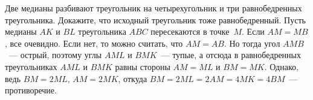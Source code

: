 \problem{}
Две медианы разбивают треугольник на четырехугольник и три равнобедренных
треугольника.
Докажите, что исходный треугольник тоже равнобедренный.
\solution
Пусть медианы $AK$ и $BL$ треугольника $ABC$ пересекаются в точке~$M$.
Если $AM = MB$, все очевидно.
Если нет, то можно считать, что $AM = AB$.
Но тогда угол $AMB$~--- острый, поэтому углы $AML$ и $BMK$~--- тупые,
а отсюда в равнобедренных треугольниках $AML$ и $BMK$ равны стороны
$AM = ML$ и $BM = MK$.
Однако, ведь $BM = 2 ML$, $AM = 2 MK$, откуда
$BM = 2 ML = 2 AM = 4 MK = 4 BM$~--- противоречие.
\endproblem
